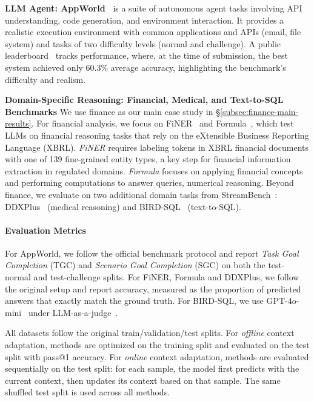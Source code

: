 \begin{packeditemize}
    \item \textbf{LLM Agent: AppWorld~\citep{trivedi2024appworld}} is a suite of autonomous agent tasks involving API understanding, code generation, and environment interaction. 
    It provides a realistic execution environment with common applications and APIs (\eg email, file system) and tasks of two difficulty levels (normal and challenge). 
    A public leaderboard~\citep{AppWorldLeaderboard} tracks performance, where, at the time of submission, the best system achieved only 60.3\% average accuracy, highlighting the benchmark’s difficulty and realism.
    \item \textbf{Domain-Specific Reasoning: Financial, Medical, and Text-to-SQL Benchmarks} We use finance as our main case study in \S\ref{subsec:finance-main-results}. 
    For financial analysis, we focus on FiNER~\citep{loukas2022finer} and Formula~\citep{wang2025finlora}, which test LLMs on financial reasoning tasks that rely on the eXtensible Business Reporting Language (XBRL).
    \emph{FiNER} requires labeling tokens in XBRL financial documents with one of 139 fine-grained entity types, a key step for financial information extraction in regulated domains.  
    \emph{Formula} focuses on applying financial concepts and performing computations to answer queries, \ie numerical reasoning.
    Beyond finance, we evaluate on two additional domain tasks from StreamBench~\citep{wu2024streambench}: DDXPlus~\citep{fansi2022ddxplus} (medical reasoning) and BIRD-SQL~\citep{li2023can} (text-to-SQL).
\end{packeditemize} 

\paragraph{Evaluation Metrics}  
For AppWorld, we follow the official benchmark protocol and report \emph{Task Goal Completion} (TGC) and \emph{Scenario Goal Completion} (SGC) on both the test-normal and test-challenge splits.  
For FiNER, Formula and DDXPlus, we follow the original setup and report accuracy, measured as the proportion of predicted answers that exactly match the ground truth. 
For BIRD-SQL, we use GPT-4o-mini~\citep{gpt4omini} under LLM-as-a-judge~\citep{zheng2023judging}. 

All datasets follow the original train/validation/test splits. 
For \emph{offline} context adaptation, methods are optimized on the training split and evaluated on the test split with pass@1 accuracy.  
For \emph{online} context adaptation, methods are evaluated sequentially on the test split: for each sample, the model first predicts with the current context, then updates its context based on that sample.  
The same shuffled test split is used across all methods.

